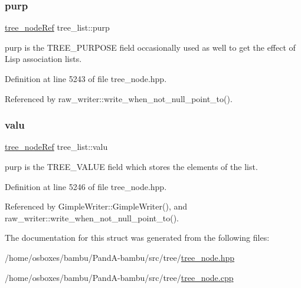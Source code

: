 \subsubsection{\texorpdfstring{purp}{purp}}
{\footnotesize\ttfamily \hyperlink{tree__node_8hpp_a6ee377554d1c4871ad66a337eaa67fd5}{tree\+\_\+node\+Ref} tree\+\_\+list\+::purp}



purp is the T\+R\+E\+E\+\_\+\+P\+U\+R\+P\+O\+SE field occasionally used as well to get the effect of Lisp association lists. 



Definition at line 5243 of file tree\+\_\+node.\+hpp.



Referenced by raw\+\_\+writer\+::write\+\_\+when\+\_\+not\+\_\+null\+\_\+point\+\_\+to().

\mbox{\label{structtree__list_a37306ae6413650f862fa00a374bef2ce}} 
\subsubsection{\texorpdfstring{valu}{valu}}
{\footnotesize\ttfamily \hyperlink{tree__node_8hpp_a6ee377554d1c4871ad66a337eaa67fd5}{tree\+\_\+node\+Ref} tree\+\_\+list\+::valu}



purp is the T\+R\+E\+E\+\_\+\+V\+A\+L\+UE field which stores the elements of the list. 



Definition at line 5246 of file tree\+\_\+node.\+hpp.



Referenced by Gimple\+Writer\+::\+Gimple\+Writer(), and raw\+\_\+writer\+::write\+\_\+when\+\_\+not\+\_\+null\+\_\+point\+\_\+to().



The documentation for this struct was generated from the following files\+:\begin{DoxyCompactItemize}
\item 
/home/osboxes/bambu/\+Pand\+A-\/bambu/src/tree/\hyperlink{tree__node_8hpp}{tree\+\_\+node.\+hpp}\item 
/home/osboxes/bambu/\+Pand\+A-\/bambu/src/tree/\hyperlink{tree__node_8cpp}{tree\+\_\+node.\+cpp}\end{DoxyCompactItemize}
